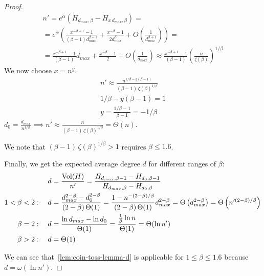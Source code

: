 \begin{proof}
\begin{gather*}
        n'=e^\alpha\left(H_{d_{max},\beta}-H_{x\,d_{max},\beta}\right)=\\
        =e^\alpha\left(
            \frac{x^{-\beta+1}-1}{(\beta-1)d_{max}^{\beta-1}}
            +\frac{x^{-\beta}-1}{2d_{max}^\beta}
            +O\left(\frac{1}{d_{max}^{\beta+1}}\right)
        \right)=\\
        =\frac{x^{-\beta+1}-1}{(\beta-1)}d_{max}
        +\frac{x^{-\beta}-1}{2}
        +O\left(\frac{1}{d_{max}}\right)
        \approx\frac{x^{-\beta+1}-1}{(\beta-1)}\left(\frac{n}{\zeta(\beta)}\right)^{1/\beta}
    \end{gather*}
    We now choose $x=n^y$.
    \begin{gather*}
        n'\approx\frac{n^{1/\beta-y(\beta-1)}}{(\beta-1)\,\zeta(\beta)^{1/\beta}}\\
        1/\beta-y(\beta-1)=1\\
        y=\frac{1/\beta-1}{\beta-1}=-1/\beta
    \end{gather*}
    $d_0=\frac{d_{max}}{n^{1/\beta}}\implies
    n'\approx\frac{n}{(\beta-1)\,\zeta(\beta)^{1/\beta}}=\Theta(n)$.
        
    We note that $(\beta-1)\,\zeta(\beta)^{1/\beta}>1$ requires $\beta\leq 1.6$.

    Finally, we get the expected average degree $d$ for different ranges of $\beta$:
    \begin{align*}
        d&=\frac{\operatorname*{Vol}(H)}{n'}=\frac{H_{d_{max},\beta-1}-H_{d_0,\beta-1}}{H_{d_{max},\beta}-H_{d_0,\beta}}\\
        1<\beta<2:\quad d&=\frac{d_{max}^{2-\beta}-d_0^{2-\beta}}{(2-\beta)\,\Theta(1)}
        =\frac{1-n^{-(2-\beta)/\beta}}{(2-\beta)\,\Theta(1)}d_{max}^{2-\beta}=\Theta\left(d_{max}^{2-\beta}\right)=\Theta\left(n'^{(2-\beta)/\beta}\right)\\
        \beta=2:\quad d&=\frac{\ln d_{max}-\ln d_0}{\Theta(1)}=\frac{\frac{1}{\beta}\ln n}{\Theta(1)}=\Theta(\ln n')\\
        \beta>2:\quad d&=\Theta(1)
    \end{align*}
    
    We can see that~\autoref{lem:coin-toss-lemma-d} is applicable for
    $1\leq\beta\leq 1.6$ because $d=\omega(\ln n')$.
\end{proof}

